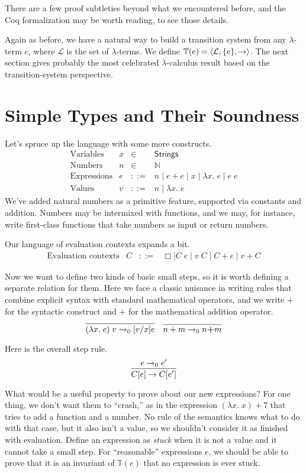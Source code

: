 \documentclass{amsbook}
\theoremstyle{definition}
\theoremstyle{remark}
\numberwithin{section}{chapter}
\numberwithin{equation}{chapter}
\begin{document}
There are a few proof subtleties beyond what we encountered before, and the Coq formalization may be worth reading, to see those details.

Again as before, we have a natural way to build a transition system from any $\lambda$-term $e$, where $\mathcal L$ is the set of $\lambda$-terms.
We define $\mathbb T(e) = {\left \langle \mathcal L, \{e\}, \to \right \rangle}$.
The next section gives probably the most celebrated $\lambda$-calculus result based on the transition-system perspective.


\section{Simple Types and Their Soundness}

Let's spruce up the language with some more constructs.
$$\begin{array}{rrcl}
  \textrm{Variables} & x &\in& \mathsf{Strings} \\
  \textrm{Numbers} & n &\in& \mathbb N \\
  \textrm{Expressions} & e &::=& n \mid e + e \mid x \mid \lambda x. \; e \mid e \; e \\
  \textrm{Values} & v &::=& n \mid \lambda x. \; e
\end{array}$$
We've added natural numbers as a primitive feature, supported via constants and addition.
Numbers may be intermixed with functions, and we may, for instance, write first-class functions that take numbers as input or return numbers.

Our language of evaluation contexts expands a bit.
$$\begin{array}{rrcl}
  \textrm{Evaluation contexts} & C &::=& \Box \mid C \; e \mid v \; C \mid C + e \mid v + C
\end{array}$$

Now we want to define two kinds of basic small steps, so it is worth defining a separate relation for them.
Here we face a classic nuisance in writing rules that combine explicit syntax with standard mathematical operators, and we write $+$ for the syntactic construct and $\textbf{+}$ for the mathematical addition operator.
$$\infer{\smallstepo{(\lambda x. \; e) \; v}{\subst{e}{x}{v}}}{}
\quad \infer{\smallstepo{n + m}{n \textbf{+} m}}{}$$

Here is the overall step rule.
$$\infer{\smallstep{\plug{C}{e}}{\plug{C}{e'}}}{
  \smallstepo{e}{e'}
}$$

What would be a useful property to prove about our new expressions?
For one thing, we don't want them to ``crash,'' as in the expression $(\lambda x. \; x) + 7$ that tries to add a function and a number.
No rule of the semantics knows what to do with that case, but it also isn't a value, so we shouldn't consider it as finished with evaluation.
Define an expression as \emph{stuck} when it is not a value and it cannot take a small step.
For ``reasonable'' expressions $e$, we should be able to prove that it is an invariant of $\mathbb T(e)$ that no expression is ever stuck.
\end{document}
